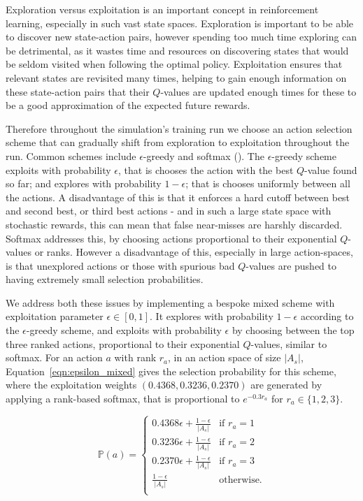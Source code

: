 \documentclass{article}
\begin{document}
Exploration versus exploitation is an important concept in reinforcement
learning, especially in such vast state spaces.
Exploration is important to be able to discover new state-action pairs, however
spending too much time exploring can be detrimental, as it wastes time and
resources on discovering states that would be seldom visited when following the
optimal policy.
Exploitation ensures that relevant states are revisited many times, helping to
gain enough information on these state-action pairs that their $Q$-values are
updated enough times for these to be a good approximation of the expected future
rewards.

Therefore throughout the simulation's training run we choose an action
selection scheme that can gradually shift from exploration to exploitation
throughout the run.
Common schemes include $\epsilon$-greedy and softmax (\cite{suttonbarto1998}).
The $\epsilon$-greedy scheme exploits with probability $\epsilon$, that is
chooses the action with the best $Q$-value found so far; and explores with
probability $1 - \epsilon$; that is chooses uniformly between all the actions.
A disadvantage of this is that it enforces a hard cutoff between best and second
best, or third best actions - and in such a large state space with stochastic
rewards, this can mean that false near-misses are harshly discarded.
Softmax addresses this, by choosing actions proportional to their exponential
$Q$-values or ranks.
However a disadvantage of this, especially in large action-spaces, is that
unexplored actions or those with spurious bad $Q$-values are pushed to having
extremely small selection probabilities.

We address both these issues by implementing a bespoke mixed scheme with
exploitation parameter $\epsilon \in [0, 1]$.
It explores with probability $1 - \epsilon$ according to the $\epsilon$-greedy
scheme, and exploits with probability $\epsilon$ by choosing between the top
three ranked actions, proportional to their exponential $Q$-values, similar to
softmax.
For an action $a$ with rank $r_a$, in an action space of size $|A_s|$,
Equation~\ref{eqn:epsilon_mixed} gives the selection probability for this
scheme, where the exploitation weights $(0.4368, 0.3236, 0.2370)$ are generated
by applying a rank-based softmax, that is proportional to $e^{-0.3 r_a}$ for
$r_a \in \{1, 2, 3\}$.

\begin{equation}\label{eqn:epsilon_mixed}
\mathbb{P}(a) = \begin{cases}
0.4368\epsilon + \frac{1 - \epsilon}{|A_s|} & \text{if } r_a = 1 \\ 
0.3236\epsilon + \frac{1 - \epsilon}{|A_s|}  & \text{if } r_a = 2 \\ 
0.2370\epsilon + \frac{1 - \epsilon}{|A_s|}  & \text{if } r_a = 3 \\ 
\frac{1 - \epsilon}{|A_s|} & \text{otherwise.} \\ 
\end{cases}
\end{equation}
\end{document}
